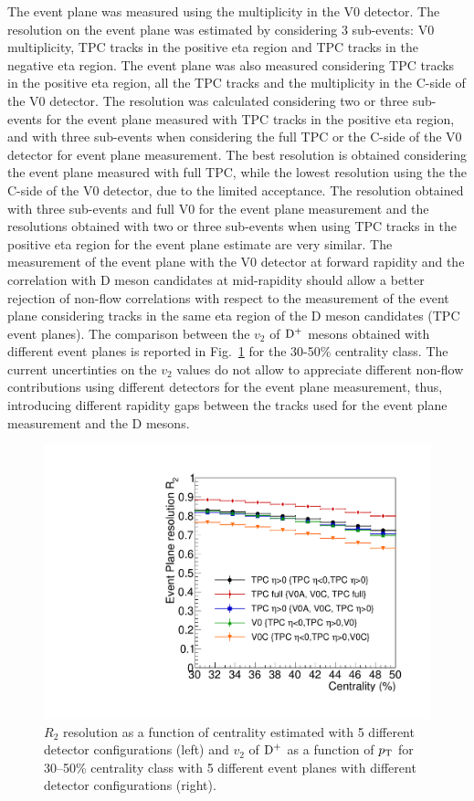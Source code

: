 The event plane was measured using the multiplicity in the V0
detector. The resolution on the event plane was estimated by considering 3
sub-events: V0 multiplicity, TPC tracks in the positive eta region
and TPC tracks in the negative eta region. The event plane was also
measured considering TPC tracks in the positive eta region, all the
TPC tracks and the multiplicity in the C-side of the V0
detector. The resolution was calculated considering two or three
sub-events for the event plane measured with TPC tracks in the
positive eta region, and with three sub-events when considering the
full TPC or the C-side of the V0 detector for event plane
measurement. The best resolution is obtained considering the event
plane measured with full TPC, while the lowest resolution using the
the C-side of the V0 detector, due to the limited acceptance. The
resolution obtained with three sub-events and full V0 for the event
plane measurement and the resolutions obtained with two or three
sub-events when using TPC tracks in the positive eta region for the
event plane estimate are very similar. The
measurement of the event plane with the V0 detector at forward
rapidity and the correlation with D meson candidates at mid-rapidity
should allow a better rejection of non-flow correlations with respect
to the measurement of the event plane considering tracks in the same
eta region of the D meson candidates (TPC event planes).
The comparison between the $v_2$ of ${\rm D^+}$ mesons obtained with 
different event planes is reported in 
Fig.~\ref{fig:dplus-4ep} for the 30-50\% centrality class. 
The current uncertinties on the $v_2$ values do not allow to
appreciate different non-flow contributions using different detectors
for the event plane measurement, thus, introducing different
rapidity gaps between the tracks used for the event plane measurement
and the D mesons.

\begin{figure}
\centering
  \includegraphics[width=.45\textwidth]{FigCap5/EPresolution_comparison.pdf}
\caption{$R_2$ resolution as a function of centrality estimated with 5 different detector configurations (left) and $v_2$ of ${\rm D^+}$ as a function of $p_{\rm T}$ for 30--50\% centrality class with 5 different event planes with different detector configurations (right).}
\label{fig:dplus-4ep}
\end{figure}

